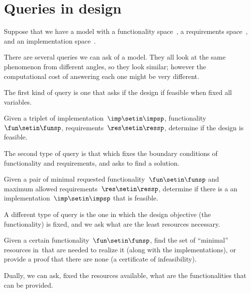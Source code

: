 
\section{Queries in design}


Suppose that we have a model with a functionality space~\funsp, a requirements space~\ressp, and an implementation space~\impsp.

There are several queries we can ask of a model.
They all look at the same phenomenon from different angles, so they look similar;
however the computational cost of answering each one might be very different.

The first kind of query is one that asks if the design if feasible when fixed all variables.

\begin{problem}
Given a triplet of implementation~$\imp\setin\impsp$, functionality~$\fun\setin\funsp$, requirements~$\res\setin\ressp$, determine if the design is feasible.
\end{problem}

The second type of query is that which fixes the boundary conditions of functionality and requirements, and asks to find a solution.

\begin{problem}
Given a pair of minimal requested functionality~$\fun\setin\funsp$ and maximum allowed requirements~$\res\setin\ressp$, determine if there is a an implementation~$\imp\setin\impsp$ that is feasible.
\end{problem}

A different type of query is the one in which the design objective (the functionality) is fixed, and we ask what are the least resources necessary.

\begin{problem}[FixFunMinRes]
\label{prob:FixFunMinRes-informal}
Given a certain functionality~$\fun\setin\funsp$, find the set of ``minimal'' resources in~\ressp that are needed to realize it (along with the implementations), or provide a proof that there are none (a certificate of infeasibility).
\end{problem}

Dually, we can ask, fixed the resources available, what are the functionalities that can be provided.

